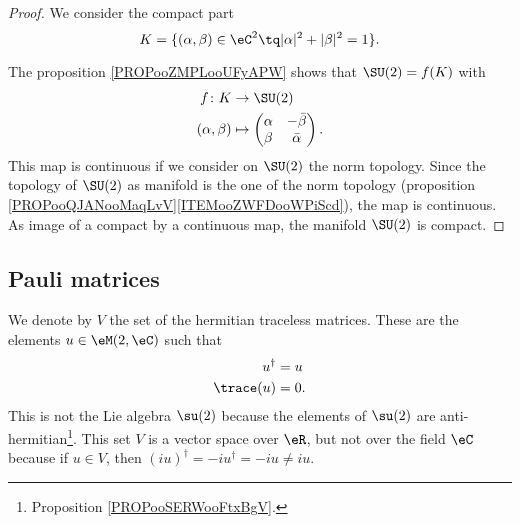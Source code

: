 \begin{proof}
	We consider the compact part
	\begin{equation}
		K=\{ (\alpha,\beta)\in \eC^2\tq | \alpha |^2+| \beta |^2=1 \}.
	\end{equation}

	The proposition \ref{PROPooZMPLooUFyAPW} shows that \( \SU(2)=f(K)\) with
	\begin{equation}
		\begin{aligned}
			f\colon K      & \to \SU(2)                   \\
			(\alpha,\beta) & \mapsto \begin{pmatrix}
				                         \alpha & -\bar\beta  \\
				                         \beta  & \bar \alpha
			                         \end{pmatrix}.
		\end{aligned}
	\end{equation}
	This map is continuous if we consider on \( \SU(2)\) the norm topology. Since the topology of \( \SU(2)\) as manifold is the one of the norm topology (proposition \ref{PROPooQJANooMaqLvV}\ref{ITEMooZWFDooWPiScd}), the map is continuous. As image of a compact by a continuous map, the manifold \( \SU(2)\) is compact.
\end{proof}

\subsection{Pauli matrices}

We denote by \( V\) the set of the hermitian traceless matrices. These are the elements \( u\in \eM(2,\eC)\) such that
\begin{subequations}
	\begin{align}
		u^{\dag}  & =u  \\
		\trace(u) & =0.
	\end{align}
\end{subequations}
This is not the Lie algebra \( \su(2)\) because the elements of \( \su(2)\) are anti-hermitian\footnote{Proposition \ref{PROPooSERWooFtxBgV}.}. This set \( V\) is a vector space over \( \eR\), but not over the field \( \eC\) because if \( u\in V\), then \( (iu)^{\dag}=-iu^{\dag}=-iu\neq iu\).

